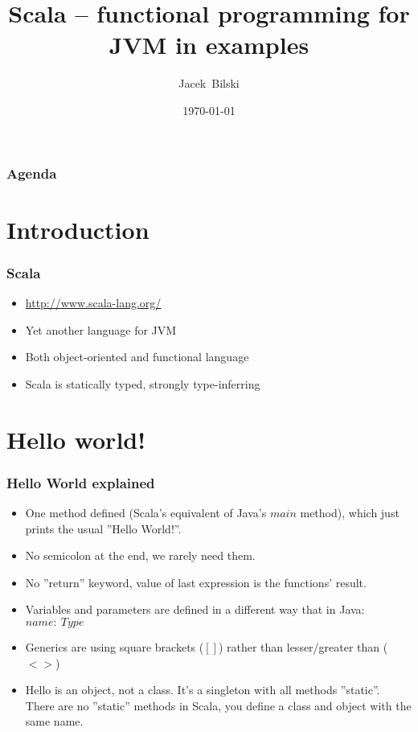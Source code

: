\documentclass[xcolor=dvipsnames]{beamer}
\title{Scala -- functional programming for JVM in examples}
\author{Jacek~Bilski}
\date{\today}
\begin{document}
\begin{frame}
\titlepage
\end{frame}

\begin{frame}
\frametitle{Agenda}
\tableofcontents[pausesections]
\end{frame}

\section{Introduction}

\begin{frame}
\frametitle{Scala}
\begin{itemize}
\item \href{http://www.scala-lang.org/}{http://www.scala-lang.org/}
\item Yet another language for JVM
\item Both object-oriented and functional language
\item Scala is statically typed, strongly type-inferring
\end{itemize}
\end{frame}

\section{Hello world!}


\begin{frame}
\frametitle{Hello World explained}
\begin{itemize}
\item One method defined (Scala's equivalent of Java's $main$ method), which just prints the usual ''Hello World!''.
\item No semicolon at the end, we rarely need them.
\item No ''return'' keyword, value of last expression is the functions' result.
\item Variables and parameters are defined in a different way that in Java: $name:\:Type$
\item Generics are using square brackets ($[]$) rather than lesser/greater than ($<>$)
\item Hello is an object, not a class. It's a singleton with all methods ''static''. There are no ''static'' methods in Scala, you define a class and object with the same name.
\end{itemize}
\end{frame}
\end{document}
